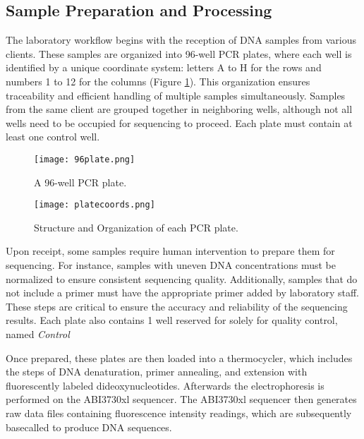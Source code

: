 \subsection{Sample Preparation and Processing}
The laboratory workflow begins with the reception of DNA samples from various clients. These samples are organized into 96-well PCR plates, where each well is identified by a unique coordinate system: letters A to H for the rows and numbers 1 to 12 for the columns (Figure \ref{fig:96_well_plate}). This organization ensures traceability and efficient handling of multiple samples simultaneously. Samples from the same client are grouped together in neighboring wells, although not all wells need to be occupied for sequencing to proceed. Each plate must contain at least one control well.
\begin{figure}[H]
  \centering
  \texttt{[image: 96plate.png]}
  \caption{A 96-well PCR plate.}
  \label{fig:96_well_plate}
\end{figure}


\begin{figure}[H]
  \centering
  \texttt{[image: platecoords.png]}
  \caption{Structure and Organization of each PCR plate.}
  \label{fig:platecoords}
\end{figure}

Upon receipt, some samples require human intervention to prepare them for sequencing. For instance, samples with uneven DNA concentrations must be normalized to ensure consistent sequencing quality. Additionally, samples that do not include a primer must have the appropriate primer added by laboratory staff. These steps are critical to ensure the accuracy and reliability of the sequencing results. Each plate also contains 1 well reserved for solely for quality control, named \textit{Control}

Once prepared, these plates are then loaded into a thermocycler, which includes the steps of DNA denaturation, primer annealing, and extension with fluorescently labeled dideoxynucleotides. Afterwards the electrophoresis is performed on the ABI3730xl sequencer. The ABI3730xl sequencer then generates raw data files containing fluorescence intensity readings, which are subsequently basecalled to produce DNA sequences.


